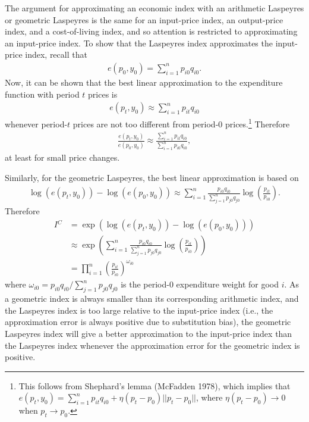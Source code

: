 \documentclass[
]{article}
\begin{document}
The argument for approximating an economic index with an arithmetic Laspeyres or geometric Laspeyres is the same for an input-price index, an output-price index, and a cost-of-living index, and so attention is restricted to approximating an input-price index. To show that the Laspeyres index approximates the input-price index, recall that
\begin{align*}
e(p_{0}, y_{0}) = \sum_{i = 1}^{n} p_{i0} q_{i0}.
\end{align*}
Now, it can be shown that the best linear approximation to the expenditure function with period \(t\) prices is
\begin{align*}
e(p_{t}, y_{0}) \approx \sum_{i = 1}^{n} p_{it}q_{i0}
\end{align*}
whenever period-\(t\) prices are not too different from period-0 prices.\footnote{This follows from Shephard's lemma (McFadden 1978), which implies that \(e(p_{t}, y_{0}) = \sum_{i = 1}^{n} p_{it}q_{i0} + \eta(p_{t} - p_{0})||p_{t} - p_{0}||\), where \(\eta(p_{t} - p_{0}) \rightarrow 0\) when \(p_{t} \rightarrow p_{0}\).} Therefore
\begin{align*}
\frac{e(p_{t}, y_{0})}{e(p_{0}, y_{0})} \approx \frac{\sum_{i = 1}^{n} p_{it} q_{i0}}{\sum_{i = 1}^{n} p_{i0} q_{i0}},
\end{align*}
at least for small price changes.

Similarly, for the geometric Laspeyres, the best linear approximation is based on
\begin{align*}
\log(e(p_{t}, y_{0})) - \log(e(p_{0}, y_{0})) \approx \sum_{i = 1}^{n} \frac{p_{i0} q_{i0}}{\sum_{j = 1}^{n} p_{j0} q_{j0}} \log\left(\frac{p_{it}}{p_{i0}} \right).
\end{align*}
Therefore
\begin{align*}
I{^C} &= \exp(\log(e(p_{t}, y_{0})) - \log(e(p_{0}, y_{0}))) \\
&\approx \exp\left( \sum_{i = 1}^{n} \frac{p_{i0} q_{i0}}{\sum_{j = 1}^{n} p_{j0} q_{j0}} \log\left(\frac{p_{it}}{p_{i0}} \right) \right) \\
&= \prod_{i = 1}^{n} \left(\frac{p_{it}}{p_{i0}} \right)^{\omega_{i0}}
\end{align*}
where \(\omega_{i0} = p_{i0} q_{i0} / \sum_{j = 1}^{n} p_{j0} q_{j0}\) is the period-0 expenditure weight for good \(i\). As a geometric index is always smaller than its corresponding arithmetic index, and the Laspeyres index is too large relative to the input-price index (i.e., the approximation error is always positive due to substitution bias), the geometric Laspeyres index will give a better approximation to the input-price index than the Laspeyres index whenever the approximation error for the geometric index is positive.
\end{document}
